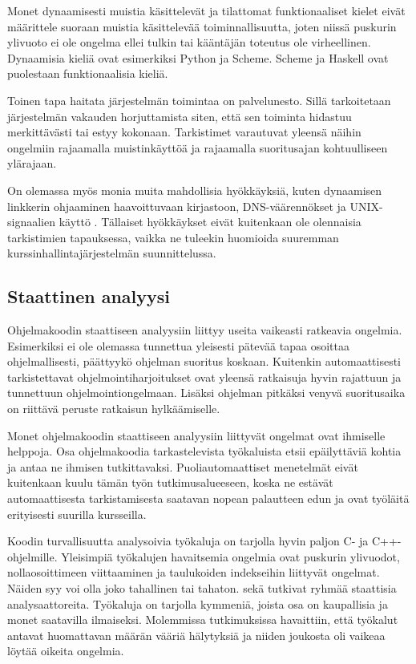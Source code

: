 Monet dynaamisesti muistia käsittelevät ja tilattomat funktionaaliset kielet
eivät määrittele suoraan muistia käsittelevää toiminnallisuutta, joten niissä
puskurin ylivuoto ei ole ongelma ellei tulkin tai kääntäjän toteutus
ole virheellinen. Dynaamisia kieliä ovat esimerkiksi Python ja Scheme. Scheme
ja Haskell ovat puolestaan funktionaalisia kieliä.

Toinen tapa haitata järjestelmän toimintaa on palvelunesto. Sillä tarkoitetaan
järjestelmän vakauden horjuttamista siten, että sen toiminta hidastuu
merkittävästi tai estyy kokonaan. Tarkistimet varautuvat yleensä näihin
ongelmiin rajaamalla muistinkäyttöä ja rajaamalla suoritusajan kohtuulliseen
ylärajaan.

On olemassa myös monia muita mahdollisia hyökkäyksiä, kuten dynaamisen linkkerin
ohjaaminen haavoittuvaan kirjastoon, DNS-väärennökset ja UNIX-signaalien käyttö
\citep{tevis2004methods}. Tällaiset hyökkäykset eivät kuitenkaan ole olennaisia
tarkistimien tapauksessa, vaikka ne tuleekin huomioida suuremman
kurssinhallintajärjestelmän suunnittelussa.

\subsection{Staattinen analyysi}

Ohjelmakoodin staattiseen analyysiin liittyy useita vaikeasti ratkeavia
ongelmia. Esimerkiksi ei ole olemassa tunnettua yleisesti pätevää
tapaa osoittaa ohjelmallisesti, päättyykö ohjelman suoritus koskaan. Kuitenkin
automaattisesti tarkistettavat ohjelmointiharjoitukset ovat yleensä ratkaisuja
hyvin rajattuun ja tunnettuun ohjelmointiongelmaan. Lisäksi ohjelman pitkäksi
venyvä suoritusaika on riittävä peruste ratkaisun hylkäämiselle.

Monet ohjelmakoodin staattiseen analyysiin liittyvät ongelmat ovat ihmiselle
helppoja. Osa ohjelmakoodia tarkastelevista työkaluista etsii epäilyttäviä
kohtia ja antaa ne ihmisen tutkittavaksi. \citep{taft2008systematic} Puoliautomaattiset
menetelmät eivät kuitenkaan kuulu tämän työn tutkimusalueeseen, koska ne
estävät automaattisesta tarkistamisesta saatavan nopean palautteen edun ja
ovat työläitä erityisesti suurilla kursseilla.

Koodin turvallisuutta analysoivia työkaluja on tarjolla hyvin paljon C- ja
C++-ohjelmille. Yleisimpiä työkalujen havaitsemia ongelmia ovat puskurin
ylivuodot, nollaosoittimeen viittaaminen ja taulukoiden indekseihin liittyvät
ongelmat. Näiden syy voi olla joko tahallinen tai tahaton.
\citet{tevis2004methods} sekä \citet{heffley2004can} tutkivat ryhmää staattisia
analysaattoreita. Työkaluja on tarjolla kymmeniä, joista osa on kaupallisia ja
monet saatavilla ilmaiseksi. Molemmissa tutkimuksissa havaittiin, että työkalut
antavat huomattavan määrän vääriä hälytyksiä ja niiden joukosta oli vaikeaa
löytää oikeita ongelmia. 

